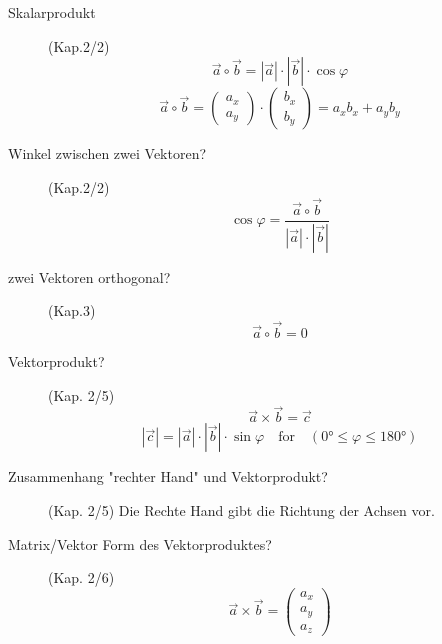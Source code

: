 \begin{description}
	\item[Skalarprodukt] (Kap.2/2) 
						\begin{equation}
							\vec{a} \circ \vec{b} = |\vec{a}| \cdot |\vec{b}| \cdot \cos\varphi 
						\end{equation}
						\begin{equation}
							\vec{a} \circ \vec{b} =
							\left(
								\begin{array}{c}
									a_{x} \\
									a_{y}
								\end{array}
							\right) 
							\cdot 
							\left(
								\begin{array}{c}
									b_{x} \\
									b_{y}
								\end{array}
							\right)
							=
							a_{x}b_{x}
							+
							a_{y}b_{y} 
						\end{equation}
	\item[Winkel zwischen zwei Vektoren?] (Kap.2/2)
		\begin{equation}
			\cos\varphi = \frac{\vec{a} \circ \vec{b}}{|\vec{a}| \cdot |\vec{b}|}
		\end{equation}	
	\item[zwei Vektoren orthogonal?] (Kap.3)
		\begin{equation}
			\vec{a} \circ \vec{b} = 0
		\end{equation}
	\item[Vektorprodukt?] (Kap. 2/5)
		\begin{equation}
			\vec{a} \times \vec{b} = \vec{c}
		\end{equation}
		\begin{equation}
			|\vec{c}| = |\vec{a}| \cdot |\vec{b}| \cdot \sin\varphi 
			\quad \textrm{for} \quad 
			(\ang{0} \leq \varphi \leq \ang{180})
		\end{equation}
	\item[Zusammenhang "rechter Hand" und Vektorprodukt?] (Kap. 2/5)
		Die Rechte Hand gibt die Richtung der Achsen vor. 
	\item[Matrix/Vektor Form des Vektorproduktes?] (Kap. 2/6)
		\begin{equation}
			\vec{a} \times \vec{b} = 
				\left(
					\begin{array}{c}
						a_{x} \\
						a_{y} \\
						a_{z}
					\end{array}
				\right)

\end{equation}
\end{description}
